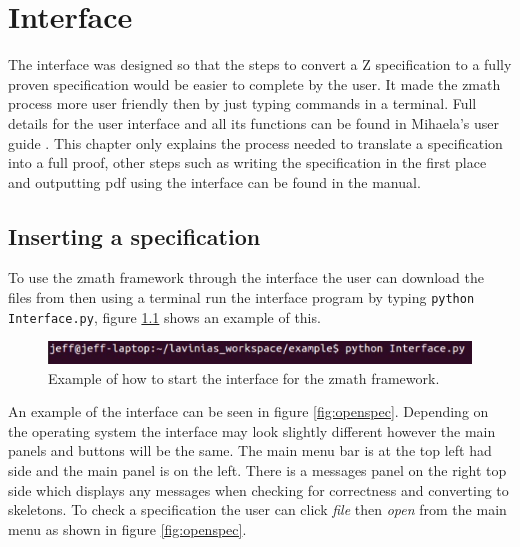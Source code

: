 \chapter{Interface}
\label{ch:interface}

The interface was designed so that the steps to convert a Z specification to a
fully proven specification would be easier to complete by the user. It made the
\gls{zmath} process more user friendly then by just typing commands in a
terminal. Full details for the user interface and all its functions can be found
in Mihaela's user guide \cite{zmathuser}. This chapter only explains the process
needed to translate a specification into a full proof, other steps such as
writing the specification in the first place and outputting pdf using the
interface can be found in the manual.

\section{Inserting a specification}
To use the \gls{zmath} framework through the interface the user can download the
files from \cite{zmathweb} then using a terminal run the interface program by
typing \newline \verb|python Interface.py|, figure \ref{fig:startinterface}
shows an example of this.

\begin{figure}[H]
\includegraphics[scale=0.6]{Figures/Interface/startinterface.png}
\caption{Example of how to start the interface for the \gls{zmath} framework. \label{fig:startinterface}}
\end{figure}

An example of the interface can be seen in figure \ref{fig:openspec}. Depending
on the operating system the interface may look slightly different however the
main panels and buttons will be the same. The main menu bar is at the top left
had side and the main panel is on the left. There is a messages panel on the
right top side which displays any messages when checking for correctness and
converting to skeletons. To check a specification the user can click \emph{file}
then \emph{open} from the main menu as shown in figure \ref{fig:openspec}.

